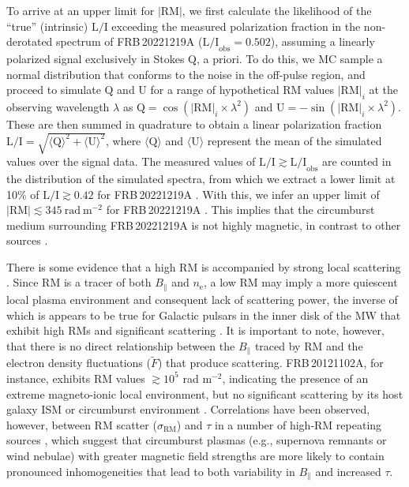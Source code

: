 \documentclass[twocolumn, linenumbers, tra]{aastex631}
\newcommand{\rev}[1]{{\color{purple}#1}}
\newcommand{\nihari}{FRB\,20221219A } %
\begin{document}
To arrive at an upper limit for $|\mathrm{RM}|$, we first calculate the likelihood of the ``true'' (intrinsic) $\mathrm{L/I}$ exceeding the measured polarization fraction in the non-derotated spectrum of \nihari ($\mathrm{L/I}_{\mathrm{obs}} = 0.502$), assuming a linearly polarized signal exclusively in Stokes $\mathrm{Q}$, a priori. To do this, we MC sample a normal distribution that conforms to the noise in the off-pulse region, and proceed to simulate $\mathrm{Q}$ and $\mathrm{U}$ for a range of hypothetical RM values $|\mathrm{RM}|_{i}$ at the observing wavelength $\lambda$ as $\mathrm{Q} = \cos \left(|\mathrm{RM}|_i \times \lambda^2\right)$ and $\mathrm{U} = -\sin \left(|\mathrm{RM}|_i \times \lambda^2\right)$. These are then summed in quadrature to obtain a linear polarization fraction $\mathrm{L/I} = \sqrt{\langle \mathrm{Q} \rangle^{2} + \langle \mathrm{U} \rangle^{2}}$, where $\langle \mathrm{Q} \rangle$ and $\langle \mathrm{U} \rangle$ represent the mean of the simulated values over the signal data. The measured values of $\mathrm{L/I} \gtrsim \mathrm{L/I}_{\mathrm{obs}}$ are counted in the distribution of the simulated spectra, from which we extract a lower limit at 10\% of $\mathrm{L/I} \gtrsim 0.42$ for \nihari. With this, we infer an upper limit of $|\mathrm{RM}| \lesssim 345\ \mathrm{rad}\ \mathrm{m}^{-2}$ for \nihari. This implies that the circumburst medium surrounding \nihari is not highly magnetic, in contrast to other sources \citep[e.g., $> 10^4\ \mathrm{rad\ m}^{-2}$ for FRB\,20190520B and FRB\,20121102A;][]{AnnaThomas2023, Michilli2018}.

There is some evidence that a high RM is accompanied by strong local scattering \citep[such as in FRB\,20190520B;][]{Ocker2022c, AnnaThomas2023}. Since RM is a tracer of both $B_{\|}$ and $n_{\mathrm{e}}$, \rev{a low RM may imply a more quiescent} local plasma environment and consequent lack of scattering power, \rev{the inverse of which is appears to be true for Galactic pulsars in the inner disk of the MW that exhibit high RMs and significant scattering} \citep{Lazio1998, Wharton2012, Eatough2013, Cordes2022}. \rev{It is important to note}, however, that there is \rev{no direct relationship} between the $B_{\|}$ traced by RM and the electron density fluctuations ($\widetilde{F}$) that produce scattering. FRB\,20121102A, for instance, exhibits RM values $\gtrsim 10^{5}$ rad m$^{-2}$, indicating the presence of an extreme magneto-ionic local environment, but no significant scattering by its host galaxy ISM or circumburst environment \citep{Michilli2018}. \rev{Correlations have been observed, however, between RM scatter ($\sigma_{\mathrm{RM}}$) and $\tau$ in a number of high-$\mathrm{RM}$ repeating sources \citep{Feng2022}, which suggest that circumburst plasmas (e.g., supernova remnants or wind nebulae) with greater magnetic field strengths are more likely to contain pronounced inhomogeneities that lead to both variability in $B_{\|}$ and increased $\tau$.}
\end{document}
